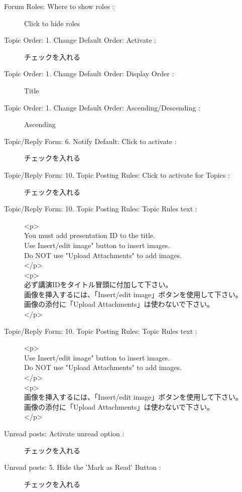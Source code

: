 \documentclass[titlepage,10pt,a4paper,uplatex]{jsbook}
\begin{document}
\begin{description}
\item[Forum Roles: Where to show roles : ] Click to hide roles
\item[Topic Order: 1. Change Default Order: Activate : ] チェックを入れる
\item[Topic Order: 1. Change Default Order: Display Order : ] Title
\item[Topic Order: 1. Change Default Order: Ascending/Descending : ] Ascending
\item[Topic/Reply Form: 6. Notify Default: Click to activate : ] チェックを入れる
\item[Topic/Reply Form: 10. Topic Posting Rules: Click to activate for Topics : ] チェックを入れる
\item[Topic/Reply Form: 10. Topic Posting Rules: Topic Rules text : ] {\textless}p{\textgreater}\\You must add presentation ID to the title.\\Use Insert/edit image" button to insert images.\\Do NOT use "Upload Attachments" to add images.\\{\textless}/p{\textgreater}\\{\textless}p{\textgreater}\\必ず講演IDをタイトル冒頭に付加して下さい。\\画像を挿入するには、「Insert/edit image」ボタンを使用して下さい。\\画像の添付に「Upload Attachments」は使わないで下さい。\\{\textless}/p{\textgreater}
\item[Topic/Reply Form: 10. Topic Posting Rules: Topic Rules text : ] {\textless}p{\textgreater}\\Use Insert/edit image" button to insert images.\\Do NOT use "Upload Attachments" to add images.\\{\textless}/p{\textgreater}\\{\textless}p{\textgreater}\\画像を挿入するには、「Insert/edit image」ボタンを使用して下さい。\\画像の添付に「Upload Attachments」は使わないで下さい。\\{\textless}/p{\textgreater}
\item[Unread posts: Activate unread option : ] チェックを入れる
\item[Unread posts: 5. Hide the 'Mark as Read' Button : ] チェックを入れる
\end{description}
\end{document}

